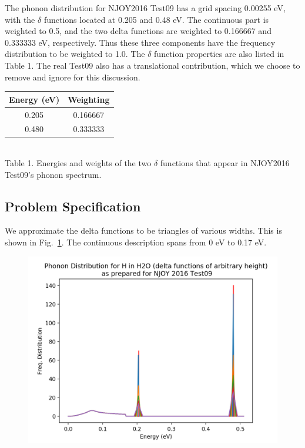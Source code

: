 \documentclass[10pt]{article}
\begin{document}
\begin{multicols}{2}
The phonon distribution for NJOY2016 Test09 has a grid spacing 0.00255 eV, with the $\delta$ functions located at 0.205 and 0.48 eV. The continuous part is weighted to 0.5, and the two delta functions are weighted to 0.166667 and 0.333333 eV, respectively. Thus these three components have the frequency distribution to be weighted to 1.0. The $\delta$ function properties are also listed in Table 1. The real Test09 also has a translational contribution, which we choose to remove and ignore for this discussion.

\begin{center}
\begin{tabular}{ |c|c| }\hline
 Energy (eV)& Weighting\\\hline
 0.205& 0.166667\\\hline
 0.480 & 0.333333 \\\hline
\end{tabular}\\[1ex]
Table 1. Energies and weights of the two $\delta$ functions that appear in NJOY2016 Test09's phonon spectrum.
\end{center}
  
  \subsection*{Problem Specification}
  We approximate the delta functions to be triangles of various widths. This is shown in Fig.~\ref{fig:waterPhononTriangle}. The continuous description spans from 0 eV to 0.17 eV.


            \begin{figure}[H]
              \begin{center}
              \includegraphics[scale=0.5]{waterPhononDistTriangles}
                \caption{}
              \label{fig:waterPhononTriangle}
              \end{center}
            \end{figure}


\end{multicols}
\end{document}
